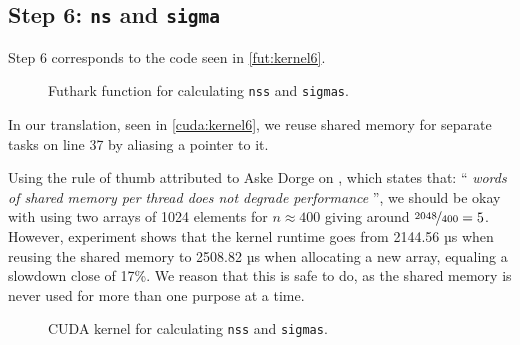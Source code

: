\subsection{
    Step 6: \texttt{ns} and \texttt{sigma}
}

Step 6 corresponds to the code seen in \autoref{fut:kernel6}.

\begin{figure}[H]
    \centering
    \caption{Futhark function for calculating \texttt{nss} and \texttt{sigmas}.}
    \label{fut:kernel6}
\end{figure}

In our translation, seen in \autoref{cuda:kernel6},
we reuse shared memory for separate tasks on line 37 by aliasing a pointer to
it. 

Using the rule of thumb attributed to Aske Dorge on \cite[p. 29]{pmphL5}, which
states that:
\enquote{
    \textit{
 words of shared memory per thread does not degrade performance
}}, 
we should be okay
with using two arrays of 1024 elements for \(n\approx400\) giving around
\(\nicefrac{2048}{400} = 5\). However, experiment shows that the kernel runtime goes
from 2144.56 µs when reusing the shared memory to 2508.82 µs when allocating a
new array, equaling a slowdown close of 17\%. We reason that this is safe to
do, as the shared memory is never used for more than one purpose at a time.

\begin{figure}[H]
    \centering
    \caption{CUDA kernel for calculating \texttt{nss} and \texttt{sigmas}.}
    \label{cuda:kernel6}
\end{figure}

